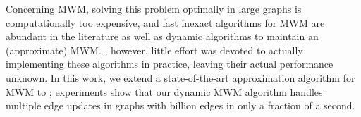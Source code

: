Concerning MWM, solving this problem optimally in large
graphs is computationally too expensive, and
fast inexact algorithms for MWM are abundant in the literature as well as dynamic
algorithms to maintain an (approximate) MWM.
, however, little effort was devoted to actually
implementing these algorithms in practice, leaving their actual performance
unknown.
In this work, we extend a state-of-the-art approximation algorithm for MWM to
; experiments show that our dynamic MWM algorithm handles
multiple edge updates in graphs with billion edges in only a fraction of a
second.

%
%
